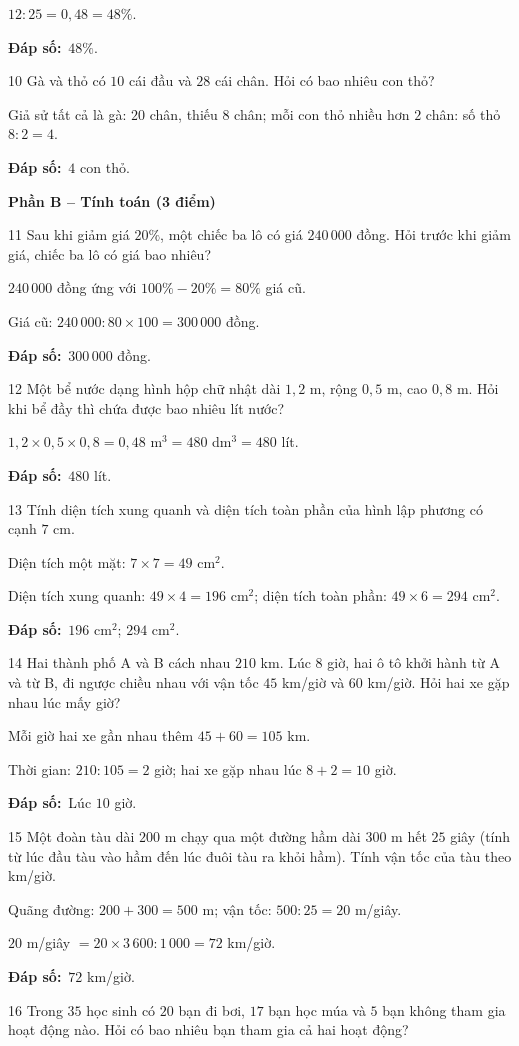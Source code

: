 \documentclass[11pt]{article}
\newif\ifsol \solfalse
\providecommand{\AnsWord}{Đáp số}
\newcommand{\dapso}[1]{\par\textbf{\AnsWord:}\ #1}
\newcommand{\probsol}[1]{%
  \begin{lrbox}{\solmeasure}\begin{minipage}{\dimexpr\linewidth-24pt\relax}#1\end{minipage}\end{lrbox}%
  \ifsol
    \begin{solbox}#1\end{solbox}%
  \else
    \setlength{\solht}{\dimexpr\ht\solmeasure+\dp\solmeasure+0.85cm\relax}%
    \ifdim\solht<1.35cm\setlength{\solht}{1.35cm}\fi
    \begin{tcolorbox}[colback=white,colframe=Line,boxrule=0.8pt,arc=5pt,
      left=8pt,right=8pt,top=4pt,bottom=4pt,height=\solht]{\footnotesize\color{Slate}\itshape\WorkWord}\end{tcolorbox}%
  \fi}
\newcommand{\dividerbar}[1]{\par\vspace{0.6em}\noindent
  \begin{tcolorbox}[enhanced,frame hidden,interior hidden,borderline west={5pt}{0pt}{ProbBlue},
    colback=white,left=12pt,right=12pt,top=5pt,bottom=5pt,arc=4pt]
  {\large\bfseries\color{ProbBlue} #1}\end{tcolorbox}\vspace{0.4em}}
\newcommand{\gap}{\vspace{0.3cm}}
\def\WorkWord{Bài làm:}
\def\AnsWord{Đáp số}
\begin{document}
\probsol{
$12:25=0{,}48=48\%$.
\dapso{$48\%$.}}
\gap
\begin{probbox}{10}{\relax}
Gà và thỏ có $10$ cái đầu và $28$ cái chân. Hỏi có bao nhiêu con thỏ?
\end{probbox}
\probsol{
Giả sử tất cả là gà: $20$ chân, thiếu $8$ chân; mỗi con thỏ nhiều hơn $2$ chân: số thỏ $8:2=4$.
\dapso{$4$ con thỏ.}}
\dividerbar{Phần B -- Tính toán (3 điểm)}
\begin{probbox}{11}{\relax}
Sau khi giảm giá $20\%$, một chiếc ba lô có giá $240\,000$ đồng. Hỏi trước khi giảm giá, chiếc ba lô có giá bao nhiêu?
\end{probbox}
\probsol{
$240\,000$ đồng ứng với $100\%-20\%=80\%$ giá cũ.\par
Giá cũ: $240\,000:80\times100=300\,000$ đồng.
\dapso{$300\,000$ đồng.}}
\gap
\begin{probbox}{12}{\relax}
Một bể nước dạng hình hộp chữ nhật dài $1{,}2$ m, rộng $0{,}5$ m, cao $0{,}8$ m. Hỏi khi bể đầy thì chứa được bao nhiêu lít nước?
\end{probbox}
\probsol{
$1{,}2\times0{,}5\times0{,}8=0{,}48$ m$^3=480$ dm$^3=480$ lít.
\dapso{$480$ lít.}}
\gap
\begin{probbox}{13}{\relax}
Tính diện tích xung quanh và diện tích toàn phần của hình lập phương có cạnh $7$ cm.
\end{probbox}
\probsol{
Diện tích một mặt: $7\times7=49$ cm$^2$.\par
Diện tích xung quanh: $49\times4=196$ cm$^2$; diện tích toàn phần: $49\times6=294$ cm$^2$.
\dapso{$196$ cm$^2$; $294$ cm$^2$.}}
\gap
\begin{probbox}{14}{\relax}
Hai thành phố A và B cách nhau $210$ km. Lúc $8$ giờ, hai ô tô khởi hành từ A và từ B, đi ngược chiều nhau với vận tốc $45$ km/giờ và $60$ km/giờ. Hỏi hai xe gặp nhau lúc mấy giờ?
\end{probbox}
\probsol{
Mỗi giờ hai xe gần nhau thêm $45+60=105$ km.\par
Thời gian: $210:105=2$ giờ; hai xe gặp nhau lúc $8+2=10$ giờ.
\dapso{Lúc $10$ giờ.}}
\gap
\begin{probbox}{15}{\relax}
Một đoàn tàu dài $200$ m chạy qua một đường hầm dài $300$ m hết $25$ giây (tính từ lúc đầu tàu vào hầm đến lúc đuôi tàu ra khỏi hầm). Tính vận tốc của tàu theo km/giờ.
\end{probbox}
\probsol{
Quãng đường: $200+300=500$ m; vận tốc: $500:25=20$ m/giây.\par
$20$ m/giây $=20\times3\,600:1\,000=72$ km/giờ.
\dapso{$72$ km/giờ.}}
\gap
\begin{probbox}{16}{\relax}
Trong $35$ học sinh có $20$ bạn đi bơi, $17$ bạn học múa và $5$ bạn không tham gia hoạt động nào. Hỏi có bao nhiêu bạn tham gia cả hai hoạt động?
\end{probbox}
\end{document}
